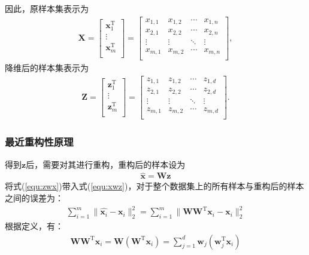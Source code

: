 \documentclass{hitreport}
\begin{document}
因此，原样本集表示为
\begin{align}
\boldsymbol{X} = \left[ \begin{array}{c}
	\boldsymbol{x}_1^{\text{T}}\\
	\vdots\\
	\boldsymbol{x}_m^{\text{T}}\\
\end{array} \right] =\left[ \begin{matrix}
	x_{1,1}&		x_{1,2}&		\cdots&		x_{1,n}\\
	x_{2,1}&		x_{2,2}&		\cdots&		x_{2,n}\\
	\vdots&		\vdots&		\ddots&		\vdots\\
	x_{m,1}&		x_{m,2}&		\cdots&		x_{m,n}\\
\end{matrix} \right],
\end{align}
降维后的样本集表示为
\begin{align}
\boldsymbol{Z} = \left[ \begin{array}{c}
	\boldsymbol{z}_1^{\text{T}}\\
	\vdots\\
	\boldsymbol{z}_m^{\text{T}}\\
\end{array} \right] =\left[ \begin{matrix}
	z_{1,1}&		z_{1,2}&		\cdots&		z_{1,d}\\
	z_{2,1}&		z_{2,2}&		\cdots&		z_{2,d}\\
	\vdots&		\vdots&		\ddots&		\vdots\\
	z_{m,1}&		z_{m,2}&		\cdots&		z_{m,d}\\
\end{matrix} \right].
\end{align}

\subsubsection{最近重构性原理}

得到$\boldsymbol{z}$后，需要对其进行重构，重构后的样本设为
\begin{align}\label{equ:xwz}
\hat{\boldsymbol{x}} = \boldsymbol{W}\boldsymbol{z}
\end{align}
将式(\ref{equ:zwx})带入式(\ref{equ:xwz})，对于整个数据集上的所有样本与重构后的样本之间的误差为：
\begin{align}
\sum_{i=1}^{m}\lVert \hat{\boldsymbol{x}_i} - \boldsymbol{x}_i \rVert_{2}^{2} = \sum_{i=1}^{m}\lVert \boldsymbol{W}\boldsymbol{W}^{\text{T}}\boldsymbol{x}_i - \boldsymbol{x}_i \rVert_{2}^{2}
\end{align}
根据定义，有：
\begin{align}\label{equ:wwx}
\boldsymbol{W}\boldsymbol{W}^{\text{T}}\boldsymbol{x}_i = \boldsymbol{W}\left(\boldsymbol{W}^{\text{T}} \boldsymbol{x}_i\right) = \sum_{j=1}^{d}\boldsymbol{w}_j\left(\boldsymbol{w}_j^{\text{T}} \boldsymbol{x}_i\right)
\end{align}
\end{document}
